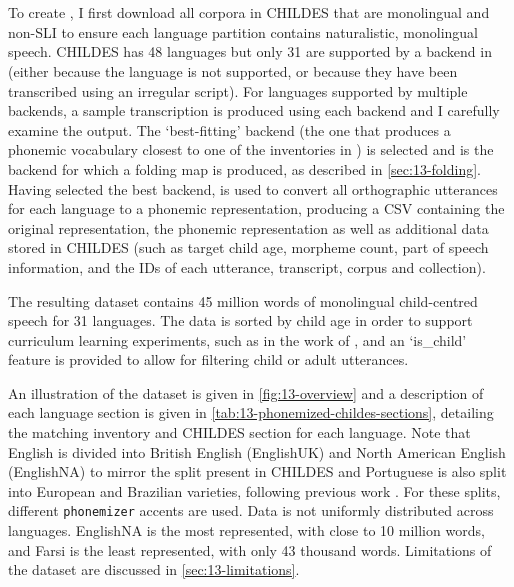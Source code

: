 
\section{\ipachildes}\label{sec:13-ipachildes}

To create \ipachildes, I first download all corpora in CHILDES that are monolingual and non-SLI to ensure each language partition contains naturalistic, monolingual speech. CHILDES has 48 languages but only 31 are supported by a backend in \gpp (either because the language is not supported, or because they have been transcribed using an irregular script). For languages supported by multiple backends, a sample transcription is produced using each backend and I carefully examine the output. The `best-fitting' backend (the one that produces a phonemic vocabulary closest to one of the inventories in \phoible) is selected and is the backend for which a folding map is produced, as described in \cref{sec:13-folding}. Having selected the best backend, \gpp is used to convert all orthographic utterances for each language to a phonemic representation, producing a CSV containing the original representation, the phonemic representation as well as additional data stored in CHILDES (such as target child age, morpheme count, part of speech information, and the IDs of each utterance, transcript, corpus and collection). 

The resulting dataset contains 45 million words of monolingual child-centred speech for 31 languages. The data is sorted by child age in order to support curriculum learning experiments, such as in the work of \citet{huebner-etal-2021-babyberta}, and an `is\_child' feature is provided to allow for filtering child or adult utterances.

An illustration of the dataset is given in \cref{fig:13-overview} and a description of each language section is given in \cref{tab:13-phonemized-childes-sections}, detailing the matching \phoible inventory and CHILDES section for each language. Note that English is divided into British English (EnglishUK) and North American English (EnglishNA) to mirror the split present in CHILDES and Portuguese is also split into European and Brazilian varieties, following previous work \citep{caines2019cross}. For these splits, different \texttt{phonemizer} accents are used. Data is not uniformly distributed across languages. EnglishNA is the most represented, with close to 10 million words, and Farsi is the least represented, with only 43 thousand words. Limitations of the dataset are discussed in \cref{sec:13-limitations}.

